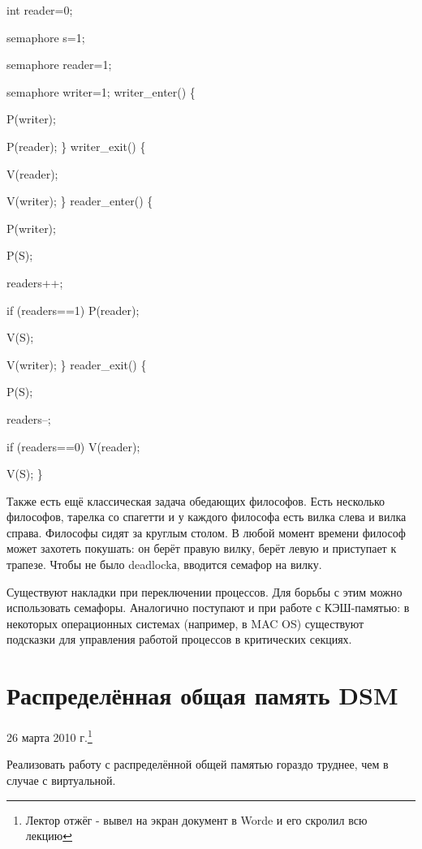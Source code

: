 \documentclass[a4paper,12pt]{article}
\begin{document}
	{\bf {int reader=0;
	
		semaphore s=1;
		
		semaphore reader=1;
		
		semaphore writer=1;
	\newline
	\newline
	writer\_enter() \{
	
		P(writer);
		
		P(reader);
	\newline
	\}
	\newline
	writer\_exit() \{
	
		V(reader);
		
		V(writer);
	\newline
	\} 
	\newline
	reader\_enter() \{
	
		P(writer);
		
		P(S);
		
		readers++;
		
		if (readers==1) P(reader);
		
		V(S);
		
		V(writer);
	\newline	
	\}
	\newline
	reader\_exit() \{
	
		P(S);
		
		readers--;
		
		if (readers==0) V(reader);
		
		V(S);
	\newline	
	\} }}
	
	Также есть ещё классическая задача обедающих философов. Есть несколько философов, тарелка со
спагетти и у каждого философа есть вилка слева и вилка справа. Философы сидят за круглым столом.
В любой момент времени философ может захотеть покушать: он берёт правую вилку, берёт левую и 
приступает к трапезе. Чтобы не было deadlockа, вводится семафор на вилку.

	Существуют накладки при переключении процессов. Для борьбы с этим можно использовать
семафоры. Аналогично поступают и при работе с КЭШ-памятью: в некоторых операционных системах
(например, в MAC OS) существуют подсказки для управления работой процессов в критических
секциях.
	\section {\bf Распределённая общая память DSM}
	\centerline{26 марта 2010 г.\footnote{Лектор отжёг - вывел на экран
	документ в Worde и его скролил всю лекцию}}
	Реализовать работу с распределённой общей памятью гораздо труднее, чем в случае с 
виртуальной.
\end{document}
